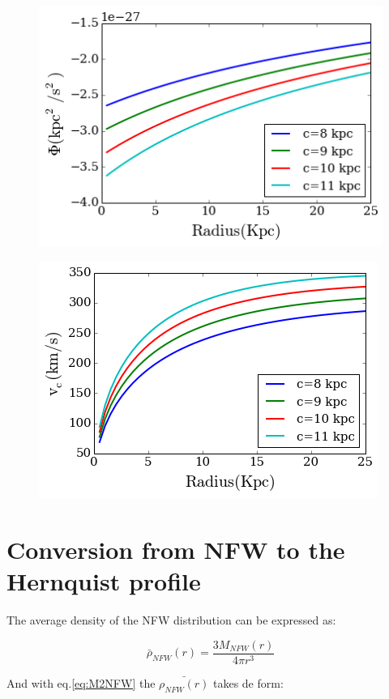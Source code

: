 \begin{figure}[H]
\centering
\includegraphics[scale=0.7]{../figures/NFW_potential.png}
\end{figure}

\begin{figure}[H]
\centering
\includegraphics[scale=0.7]{../figures/NFW_vc.png}
\end{figure}



\section{Conversion from NFW to the Hernquist profile}

The average density of the NFW distribution can be expressed as:

\begin{equation}
\bar \rho_{NFW}(r) = \dfrac{3M_{NFW}(r)}{4 \pi r^3} 
\end{equation}

And with eq.\ref{eq:M2NFW} the $\bar{\rho_{NFW}(r)}$ takes de form:

